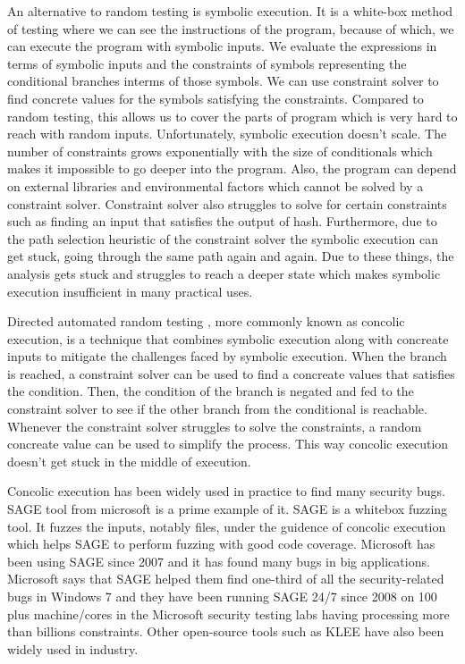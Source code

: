 \documentclass[	runningheads,
				a4paper]{llncs}
\begin{document}
An alternative to random testing is symbolic execution. It is a white-box method of testing where we can see the instructions of the program, because of which, we can execute the program with symbolic inputs. We evaluate the expressions in terms of symbolic inputs and the constraints of symbols representing the conditional branches interms of those symbols. We can use constraint solver to find concrete values for the symbols satisfying the constraints. Compared to random testing, this allows us to cover the parts of program which is very hard to reach with random inputs. Unfortunately, symbolic execution doesn't scale. The number of constraints grows exponentially with the size of conditionals which makes it impossible to go deeper into the program. Also, the program can depend on external libraries and environmental factors which cannot be solved by a constraint solver. Constraint solver also struggles to solve for certain constraints such as finding an input that satisfies the output of hash. Furthermore, due to the path selection heuristic of the constraint solver the symbolic execution can get stuck, going through the same path again and again. Due to these things, the analysis gets stuck and struggles to reach a deeper state which makes symbolic execution insufficient in many practical uses.

Directed automated random testing \cite[DART]{godefroid2005dart}, more commonly known as concolic execution, is a technique that combines symbolic execution along with concreate inputs to mitigate the challenges faced by symbolic execution. When the branch is reached, a constraint solver can be used to find a concreate values that satisfies the condition. Then, the condition of the branch is negated and fed to the constraint solver to see if the other branch from the conditional is reachable. Whenever the constraint solver struggles to solve the constraints, a random concreate value can be used to simplify the process. This way concolic execution doesn't get stuck in the middle of execution. 

Concolic execution has been widely used in practice to find many security bugs. SAGE \cite{godefroid2012sage} tool from microsoft is a prime example of it. SAGE is a whitebox fuzzing tool. It fuzzes the inputs, notably files,
under the guidence of concolic execution which helps SAGE to perform fuzzing with good code coverage. Microsoft has been using SAGE since 2007 and it has found many bugs in big applications. Microsoft says \cite{godefroid2012sage} that SAGE helped them find one-third of all the security-related bugs in Windows 7 and they have been running SAGE 24/7 since 2008 on 100 plus machine/cores in the Microsoft security testing labs having processing more than billions constraints. Other open-source tools such as KLEE \cite{cadar2008klee} have also been widely used in industry.
\end{document}
